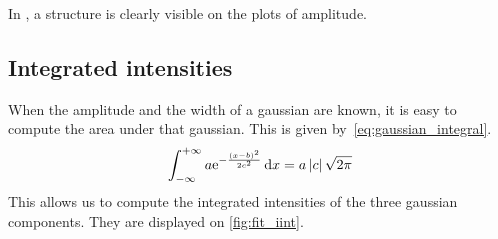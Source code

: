 In , a structure is clearly visible on the plots of amplitude.




\subsection{Integrated intensities}
When the amplitude and the width of a gaussian are known, it is easy to compute the area under that gaussian.
This is given by~\cref{eq:gaussian_integral}.
\begin{equation}
    \int_{-\infty}^{+\infty} a \mathrm{e}^{- \frac{(x-b)^2}{2 c^2}}\,\mathrm{d}x
    =
    a \left| c \right| \sqrt{2\pi}
    \label{eq:gaussian_integral}
\end{equation}
This allows us to compute the integrated intensities of the three gaussian components.
They are displayed on \cref{fig:fit_iint}.


